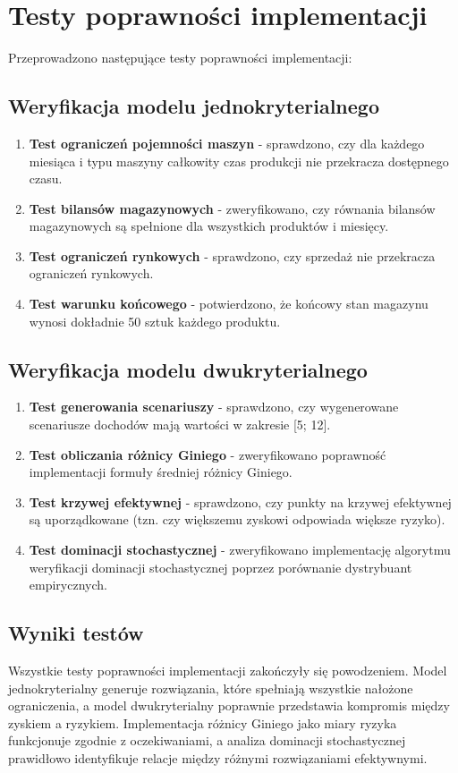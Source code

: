 \section{Testy poprawności implementacji}

Przeprowadzono następujące testy poprawności implementacji:

\subsection{Weryfikacja modelu jednokryterialnego}
\begin{enumerate}
  \item \textbf{Test ograniczeń pojemności maszyn} - sprawdzono, czy dla każdego miesiąca i typu maszyny całkowity czas produkcji nie przekracza dostępnego czasu.
  \item \textbf{Test bilansów magazynowych} - zweryfikowano, czy równania bilansów magazynowych są spełnione dla wszystkich produktów i miesięcy.
  \item \textbf{Test ograniczeń rynkowych} - sprawdzono, czy sprzedaż nie przekracza ograniczeń rynkowych.
  \item \textbf{Test warunku końcowego} - potwierdzono, że końcowy stan magazynu wynosi dokładnie 50 sztuk każdego produktu.
\end{enumerate}

\subsection{Weryfikacja modelu dwukryterialnego}
\begin{enumerate}
  \item \textbf{Test generowania scenariuszy} - sprawdzono, czy wygenerowane scenariusze dochodów mają wartości w zakresie [5; 12].
  \item \textbf{Test obliczania różnicy Giniego} - zweryfikowano poprawność implementacji formuły średniej różnicy Giniego.
  \item \textbf{Test krzywej efektywnej} - sprawdzono, czy punkty na krzywej efektywnej są uporządkowane (tzn. czy większemu zyskowi odpowiada większe ryzyko).
  \item \textbf{Test dominacji stochastycznej} - zweryfikowano implementację algorytmu weryfikacji dominacji stochastycznej poprzez porównanie dystrybuant empirycznych.
\end{enumerate}

\subsection{Wyniki testów}

Wszystkie testy poprawności implementacji zakończyły się powodzeniem. Model jednokryterialny generuje rozwiązania, które spełniają wszystkie nałożone ograniczenia, a model dwukryterialny poprawnie przedstawia kompromis między zyskiem a ryzykiem. Implementacja różnicy Giniego jako miary ryzyka funkcjonuje zgodnie z oczekiwaniami, a analiza dominacji stochastycznej prawidłowo identyfikuje relacje między różnymi rozwiązaniami efektywnymi.

